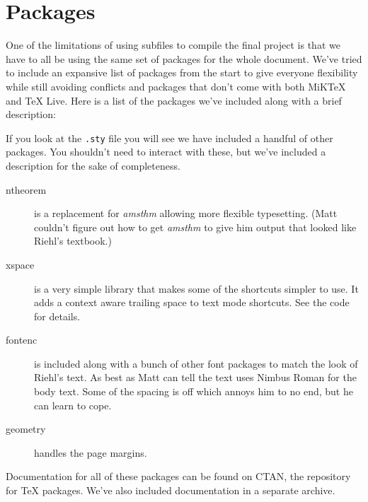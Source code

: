 \documentclass{article}
\begin{document}
\section*{Packages}
One of the limitations of using subfiles to compile the final project is that we
have to all be using the same set of packages for the whole document. We've
tried to include an expansive list of packages from the start to give everyone
flexibility while still avoiding conflicts and packages that don't come with
both MiKTeX and TeX Live. Here is a list of the packages we've included along
with a brief description:
If you look at the \texttt{.sty} file you will see we have included a handful of
other packages. You shouldn't need to interact with these, but we've included a
description for the sake of completeness.
\begin{description}
	\item[ntheorem] is a replacement for \emph{amsthm} allowing more
		flexible typesetting. (Matt couldn't figure out how to get \emph{amsthm}
		to give him output that looked like Riehl's textbook.)

	\item[xspace] is a very simple library that makes some of the shortcuts
		simpler to use. It adds a context aware trailing space to text mode
		shortcuts. See the code for details.

	\item[fontenc] is included along with a bunch of other font packages to
		match the look of Riehl's text. As best as Matt can tell the text uses
		Nimbus Roman for the body text. Some of the spacing is off which annoys
		him to no end, but he can learn to cope.

	\item[geometry] handles the page margins.
\end{description}
Documentation for all of these packages can be found on CTAN, the repository for
\TeX{} packages. We've also included documentation in a separate archive.
\end{document}
